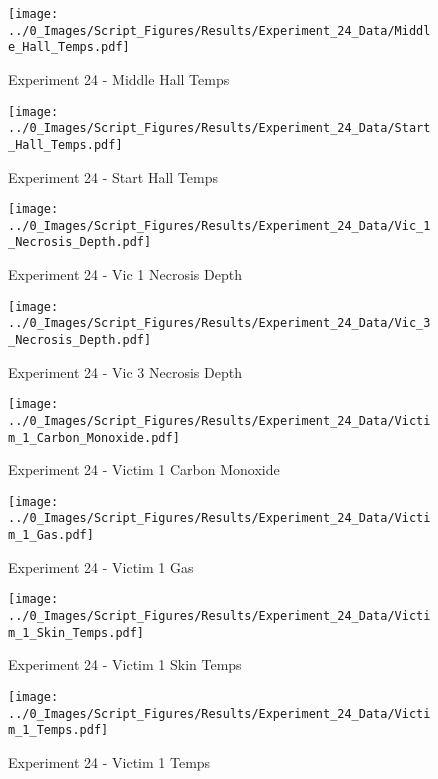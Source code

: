 	\begin{figure}[H]
		\centering
		\texttt{[image: ../0\_Images/Script\_Figures/Results/Experiment\_24\_Data/Middle\_Hall\_Temps.pdf]}
		\caption[]{Experiment 24 - Middle Hall Temps}
	\end{figure}
 
	\clearpage

	\begin{figure}[H]
		\centering
		\texttt{[image: ../0\_Images/Script\_Figures/Results/Experiment\_24\_Data/Start\_Hall\_Temps.pdf]}
		\caption[]{Experiment 24 - Start Hall Temps}
	\end{figure}
 

	\begin{figure}[H]
		\centering
		\texttt{[image: ../0\_Images/Script\_Figures/Results/Experiment\_24\_Data/Vic\_1\_Necrosis\_Depth.pdf]}
		\caption[]{Experiment 24 - Vic 1 Necrosis Depth}
	\end{figure}
 
	\clearpage

	\begin{figure}[H]
		\centering
		\texttt{[image: ../0\_Images/Script\_Figures/Results/Experiment\_24\_Data/Vic\_3\_Necrosis\_Depth.pdf]}
		\caption[]{Experiment 24 - Vic 3 Necrosis Depth}
	\end{figure}
 

	\begin{figure}[H]
		\centering
		\texttt{[image: ../0\_Images/Script\_Figures/Results/Experiment\_24\_Data/Victim\_1\_Carbon\_Monoxide.pdf]}
		\caption[]{Experiment 24 - Victim 1 Carbon Monoxide}
	\end{figure}
 
	\clearpage

	\begin{figure}[H]
		\centering
		\texttt{[image: ../0\_Images/Script\_Figures/Results/Experiment\_24\_Data/Victim\_1\_Gas.pdf]}
		\caption[]{Experiment 24 - Victim 1 Gas}
	\end{figure}
 

	\begin{figure}[H]
		\centering
		\texttt{[image: ../0\_Images/Script\_Figures/Results/Experiment\_24\_Data/Victim\_1\_Skin\_Temps.pdf]}
		\caption[]{Experiment 24 - Victim 1 Skin Temps}
	\end{figure}
 
	\clearpage

	\begin{figure}[H]
		\centering
		\texttt{[image: ../0\_Images/Script\_Figures/Results/Experiment\_24\_Data/Victim\_1\_Temps.pdf]}
		\caption[]{Experiment 24 - Victim 1 Temps}
	\end{figure}
 

